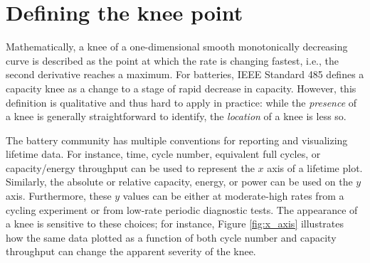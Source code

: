 \documentclass[journal=jpclcd,manuscript=article]{achemso}
\newcommand{\cmark}{\textcolor{blue}{\textrm{\ding{52}}}}%
\newcommand{\pbox}[1]{{
\fbox{
\parbox{0.8\textwidth}{  \fbox{$\triangleright$\textcolor{blue}{\textbf{Peter}:}} 
#1
}}}}
\begin{document}
\section{Defining the knee point}


Mathematically, a knee of a one-dimensional smooth monotonically decreasing curve is described as the point at which the rate is changing fastest, i.e., the second derivative reaches a maximum. For batteries, IEEE Standard 485 defines a capacity knee as a change to a stage of rapid decrease in capacity\cite{noauthor_ieee_2011}. However, this definition is qualitative and thus hard to apply in practice: while the \textit{presence} of a knee is generally straightforward to identify, the \textit{location} of a knee is less so. 

The battery community has multiple conventions for reporting and visualizing lifetime data. For instance, time, cycle number, equivalent full cycles, or capacity/energy throughput can be used to represent the $x$ axis of a lifetime plot. Similarly, the absolute or relative capacity, energy, or power can be used on the $y$ axis. Furthermore, these $y$ values can be either at moderate-high rates from a cycling experiment or from low-rate periodic diagnostic tests. The appearance of a knee is sensitive to these choices; for instance, Figure \ref{fig:x_axis} illustrates how the same data plotted as a function of both cycle number and capacity throughput can change the apparent severity of the knee.
\end{document}
